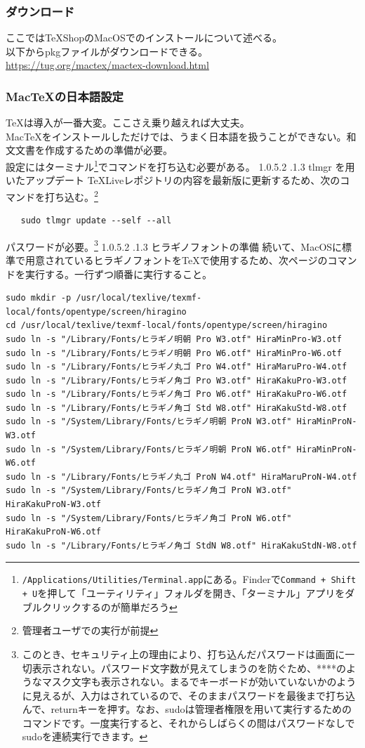 \documentclass[dvipdfmx,jb5]{jarticle}
\makeatletter
\newcommand{\subsubsubsection}{\@startsection{paragraph}{4}{\z@}%
    {1.0\Cvs \@plus.5\Cdp \@minus.2\Cdp}%
    {.1\Cvs \@plus.3\Cdp}%
    {\large \bfseries}
  }
\makeatother
\begin{document}
  \subsubsection{ダウンロード}
  ここではTeXShopのMacOSでのインストールについて述べる。\\
  以下からpkgファイルがダウンロードできる。\\
  \url{https://tug.org/mactex/mactex-download.html}
  \subsubsection{Mac\TeX の日本語設定}
  \TeX は導入が一番大変。ここさえ乗り越えれば大丈夫。\\
  Mac\TeX をインストールしただけでは、うまく日本語を扱うことができない。和文文書を作成するための準備が必要。\\
  設定にはターミナル\footnote{\texttt{/Applications/Utilities/Terminal.app}にある。Finderで\texttt{Command + Shift + U}を押して「ユーティリティ」フォルダを開き、「ターミナル」アプリをダブルクリックするのが簡単だろう}でコマンドを打ち込む必要がある。
  \subsubsubsection{tlmgr を用いたアップデート}
  \TeX Liveレポジトリの内容を最新版に更新するため、次のコマンドを打ち込む。\footnote{管理者ユーザでの実行が前提}
  \begin{lstlisting}
   sudo tlmgr update --self --all
  \end{lstlisting}
  パスワードが必要。\footnote{このとき、セキュリティ上の理由により、打ち込んだパスワードは画面に一切表示されない。パスワード文字数が見えてしまうのを防ぐため、****のようなマスク文字も表示されない。まるでキーボードが効いていないかのように見えるが、入力はされているので、そのままパスワードを最後まで打ち込んで、returnキーを押す。なお、sudoは管理者権限を用いて実行するためのコマンドです。一度実行すると、それからしばらくの間はパスワードなしでsudoを連続実行できます。}
  \subsubsubsection{ヒラギノフォントの準備}
  続いて、MacOSに標準で用意されているヒラギノフォントを\TeX で使用するため、次ページのコマンドを実行する。一行ずつ順番に実行すること。
  \newpage
  \begin{lstlisting}
sudo mkdir -p /usr/local/texlive/texmf-local/fonts/opentype/screen/hiragino
cd /usr/local/texlive/texmf-local/fonts/opentype/screen/hiragino
sudo ln -s "/Library/Fonts/ヒラギノ明朝 Pro W3.otf" HiraMinPro-W3.otf
sudo ln -s "/Library/Fonts/ヒラギノ明朝 Pro W6.otf" HiraMinPro-W6.otf
sudo ln -s "/Library/Fonts/ヒラギノ丸ゴ Pro W4.otf" HiraMaruPro-W4.otf
sudo ln -s "/Library/Fonts/ヒラギノ角ゴ Pro W3.otf" HiraKakuPro-W3.otf
sudo ln -s "/Library/Fonts/ヒラギノ角ゴ Pro W6.otf" HiraKakuPro-W6.otf
sudo ln -s "/Library/Fonts/ヒラギノ角ゴ Std W8.otf" HiraKakuStd-W8.otf
sudo ln -s "/System/Library/Fonts/ヒラギノ明朝 ProN W3.otf" HiraMinProN-W3.otf
sudo ln -s "/System/Library/Fonts/ヒラギノ明朝 ProN W6.otf" HiraMinProN-W6.otf
sudo ln -s "/Library/Fonts/ヒラギノ丸ゴ ProN W4.otf" HiraMaruProN-W4.otf
sudo ln -s "/System/Library/Fonts/ヒラギノ角ゴ ProN W3.otf" HiraKakuProN-W3.otf
sudo ln -s "/System/Library/Fonts/ヒラギノ角ゴ ProN W6.otf" HiraKakuProN-W6.otf
sudo ln -s "/Library/Fonts/ヒラギノ角ゴ StdN W8.otf" HiraKakuStdN-W8.otf
\end{lstlisting}
\end{document}
